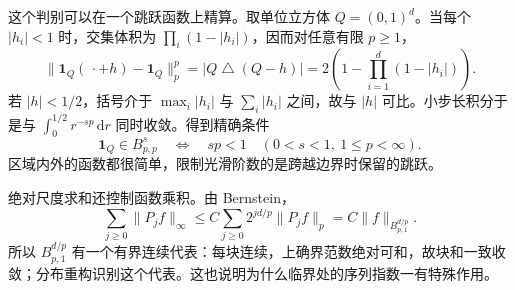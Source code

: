 \ProseParagraphBreak

这个判别可以在一个跳跃函数上精算。取单位立方体 \(Q=(0,1)^d\)。当每个 \(|h_i|<1\) 时，交集体积为 \(\prod_i(1-|h_i|)\)，因而对任意有限 \(p\geq1\)，
\[
 \|\mathbf1_Q(\,\cdot+h)-\mathbf1_Q\|_p^p
 =|Q\mathbin{\triangle}(Q-h)|
 =2\left(1-\prod_{i=1}^d(1-|h_i|)\right).
\]
若 \(|h|<1/2\)，括号介于 \(\max_i|h_i|\) 与 \(\sum_i|h_i|\) 之间，故与 \(|h|\) 可比。小步长积分于是与 \(\int_0^{1/2}r^{-sp}\,\mathrm dr\) 同时收敛。得到精确条件
\[
 \mathbf1_Q\in B^s_{p,p}\quad\Longleftrightarrow\quad sp<1
 \quad(0<s<1,\ 1\leq p<\infty).
\]
区域内外的函数都很简单，限制光滑阶数的是跨越边界时保留的跳跃。

\ProseParagraphBreak

绝对尺度求和还控制函数乘积。由 Bernstein，
\[
 \sum_{j\geq0}\|P_jf\|_\infty
 \leq C\sum_{j\geq0}2^{jd/p}\|P_jf\|_p
 =C\|f\|_{B^{d/p}_{p,1}}.
\]
所以 \(B^{d/p}_{p,1}\) 有一个有界连续代表：每块连续，上确界范数绝对可和，故块和一致收敛；分布重构识别这个代表。这也说明为什么临界处的序列指数一有特殊作用。

